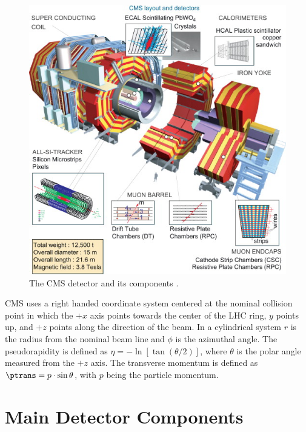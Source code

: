 \begin{figure}[h]
\centering
\includegraphics[scale=1.1]{figures/experiment/cmsLayout.jpg}
\vskip 1cm
\caption[The CMS detector and its components]{The CMS detector and its components \cite{CMS:1997263}.}
\label{CMSlayout}
\end{figure}

CMS uses a right handed coordinate system centered at the nominal collision point in which the  $+x$ axis points towards the center of the LHC ring, $y$ points up, and $+z$ points along the direction of the beam. In a cylindrical system $r$ is the radius from the nominal beam line and $\phi$ is the azimuthal angle. The pseudorapidity is defined as $\eta = -\ln [\tan(\theta/2) ]$, where $\theta$ is the polar angle measured from the $+z$ axis. The transverse momentum is defined as $\ptrans=p\cdot\sin\theta$, with $p$ being the particle momentum.

\section{Main Detector Components}


